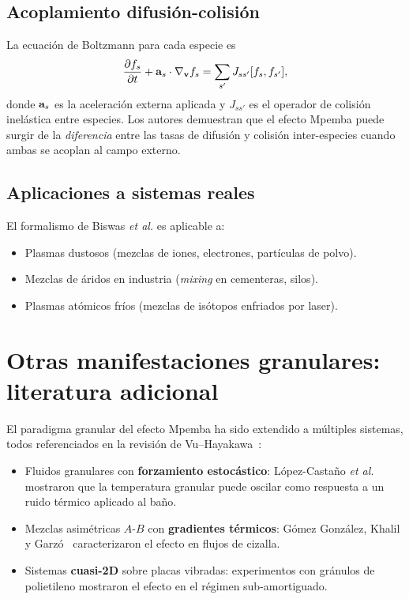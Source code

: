 \subsection{Acoplamiento difusión-colisión}

La ecuación de Boltzmann para cada especie es
\begin{equation}
    \pdv{f_s}{t} + \vb{a}_{s} \cdot \nabla_{\vb{v}} f_s = \sum_{s'} J_{ss'}[f_s, f_{s'}],
\end{equation}
%
donde $\vb{a}_s$ es la aceleración externa aplicada y $J_{ss'}$ es el operador 
de colisión inelástica entre especies. Los autores demuestran que el efecto 
Mpemba puede surgir de la \emph{diferencia} entre las tasas de difusión y 
colisión inter-especies cuando ambas se acoplan al campo externo.

\subsection{Aplicaciones a sistemas reales}

El formalismo de Biswas \emph{et al.} es aplicable a:
\begin{itemize}
\item Plasmas dustosos (mezclas de iones, electrones, partículas de polvo).
\item Mezclas de áridos en industria (\emph{mixing} en cementeras, silos).
\item Plasmas atómicos fríos (mezclas de isótopos enfriados por laser).
\end{itemize}

\section{Otras manifestaciones granulares: literatura adicional}

El paradigma granular del efecto Mpemba ha sido extendido a múltiples sistemas, 
todos referenciados en la revisión de Vu--Hayakawa~\cite{vuhayakawa2025}:

\begin{itemize}
\item Fluidos granulares con \textbf{forzamiento estocástico}: López-Castaño 
\emph{et al.} mostraron que la temperatura granular puede oscilar como respuesta 
a un ruido térmico aplicado al baño.
\item Mezclas asimétricas $A$-$B$ con \textbf{gradientes térmicos}: Gómez 
González, Khalil y Garzó~\cite{biswas2020} caracterizaron el efecto en flujos 
de cizalla.
\item Sistemas \textbf{cuasi-2D} sobre placas vibradas: experimentos con 
gránulos de polietileno mostraron el efecto en el régimen sub-amortiguado.
\end{itemize}

